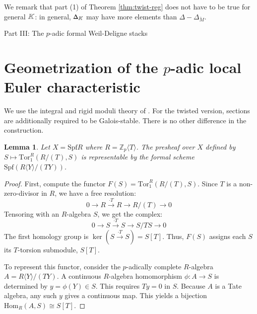 \documentclass[11pt]{amsart}
\newtheorem{lem}[thm]{Lemma}
\theoremstyle{definition}
\newcommand{\doublestroke}[1]{\pdfliteral{1 Tr .3 w}#1\pdfliteral{0 Tr 0 w}}
\newcommand{\BK}{\doublestroke{K}}
\newcommand{\BDelta}{%
    \scalebox{.8}{$\Delta$}%
    \llap{%
            \scalebox{.9}{$\Delta$}%
    }%
}
\newcommand{\bM}{\breve{M}}
\begin{document}
We remark that part (1) of 
Theorem 
\ref{thm:twist-reg}
does not have to be true for general $\BK$:
in general, $\BDelta_{\BK}$ may have more elements
than $\Delta-\Delta_{\bM}$.

\newpage
{}
{}

\noindent
{\large Part III: The $p$-adic formal Weil-Deligne stacks}

\section{Geometrization of the $p$-adic local Euler characteristic}

We use the integral and rigid moduli theory of
\cite[Lemma 11 and Theorems 10--12]{Lin25}.
For the twisted version, sections are additionally required
to be Galois-stable.
There is no other difference in the construction.


\begin{lem}
\rm
Let $X = \mathrm{Spf} R$ where
$R = \mathbb{Z}_p\langle T \rangle$.
The presheaf over $X$ defined by
$S \mapsto \mathrm{Tor}^R_1(R/(T), S)$
is representable by the formal scheme
$\mathrm{Spf}(R\langle Y \rangle / (TY))$.
\end{lem}

\begin{proof}
First, compute the functor
$F(S) = \mathrm{Tor}^R_1(R/(T), S)$.
Since $T$ is a non-zero-divisor in $R$,
we have a free resolution:
\[ 0 \to R \xrightarrow{\cdot T} R \to
R/(T) \to 0 \]
Tensoring with an $R$-algebra $S$,
we get the complex:
\[ 0 \to S \xrightarrow{\cdot T} S \to
S/TS \to 0 \]
The first homology group is
$\ker(S \xrightarrow{\cdot T} S) = S[T]$.
Thus, $F(S)$ assigns each $S$ its
$T$-torsion submodule, $S[T]$.

To represent this functor, consider
the $p$-adically complete $R$-algebra
$A = R\langle Y \rangle / (TY)$.
A continuous $R$-algebra homomorphism
$\phi: A \to S$ is determined by
$y = \phi(Y) \in S$.
This requires $Ty = 0$ in $S$.
Because $A$ is a Tate algebra,
any such $y$ gives a continuous map.
This yields a bijection
$\mathrm{Hom}_{R}(A, S) \cong S[T]$.
\end{proof}
\end{document}
